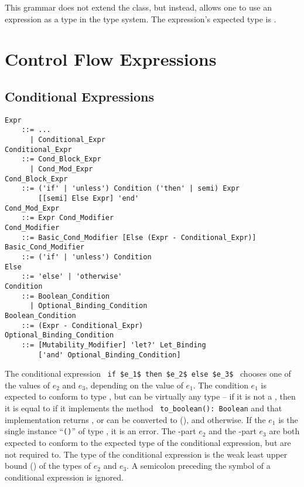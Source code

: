 This grammar does not extend the  class, but instead, allows one to use an expression as a type in the type system. The expression's expected type is . %





\section{Control Flow Expressions}





\subsection{Conditional Expressions}
\label{sec:conditional-expressions}
\grammar\begin{lstlisting}
Expr
    ::= ...
      | Conditional_Expr
Conditional_Expr
    ::= Cond_Block_Expr 
      | Cond_Mod_Expr
Cond_Block_Expr 
    ::= ('if' | 'unless') Condition ('then' | semi) Expr
        [[semi] Else Expr] 'end'
Cond_Mod_Expr
    ::= Expr Cond_Modifier
Cond_Modifier 
    ::= Basic_Cond_Modifier [Else (Expr - Conditional_Expr)]
Basic_Cond_Modifier
    ::= ('if' | 'unless') Condition 
Else 
    ::= 'else' | 'otherwise'
Condition 
    ::= Boolean_Condition 
      | Optional_Binding_Condition
Boolean_Condition 
    ::= (Expr - Conditional_Expr) 
Optional_Binding_Condition 
    ::= [Mutability_Modifier] 'let?' Let_Binding 
        ['and' Optional_Binding_Condition]
\end{lstlisting}

The conditional expression ~\lstinline!if $e_1$ then $e_2$ else $e_3$!~ chooses one of the values of $e_2$ and $e_3$, depending on the value of $e_1$. The condition $e_1$ is expected to conform to type , but can be virtually any type -- if it is not a , then it is equal to  if it implements the method ~\lstinline!to_boolean(): Boolean! and that implementation returns , or can be converted to  (), and  otherwise. If the $e_1$ is the single instance ``\lstinline!()!'' of type , it is an error. The -part $e_2$ and the -part $e_3$ are both expected to conform to the expected type of the conditional expression, but are not required to. The type of the conditional expression is the weak least upper bound () of the types of $e_2$ and $e_3$. A semicolon preceding the  symbol of a conditional expression is ignored. 

